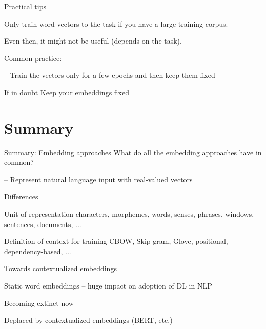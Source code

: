 \documentclass[12pt]{beamer}
\begin{document}
\begin{frame}{Practical tips}
	
Only train word vectors to the task if you have a large training corpus.

Even then, it might not be useful (depends on the task).

\bigskip

Common practice: 

-- Train the vectors only for a few epochs and then keep them fixed

\begin{block}{If in doubt}
	Keep your embeddings fixed
\end{block}


\end{frame}

\section{Summary}

\begin{frame}{Summary: Embedding approaches}
What do all the embedding approaches have in common? 

-- Represent natural language input with real-valued vectors

Differences

\begin{exampleblock}{Unit of representation}
characters, morphemes, words, senses, phrases, windows, sentences, documents, ...
\end{exampleblock}

\begin{exampleblock}{Definition of context for training}
CBOW, Skip-gram, Glove, positional, dependency-based, ...
\end{exampleblock}


\end{frame}

	
\begin{frame}{Towards contextualized embeddings}

Static word embeddings -- huge impact on adoption of DL in NLP

Becoming extinct now

Deplaced by contextualized embeddings (BERT, etc.)
	
\end{frame}
\end{document}
